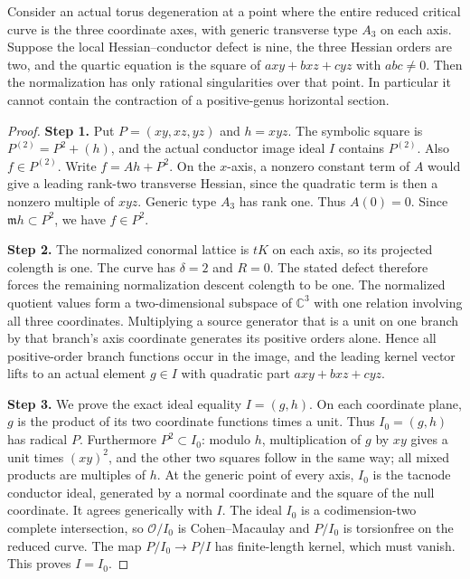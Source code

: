 \begin{proposition}[P4.47]
Consider an actual torus degeneration at a point where the
entire reduced critical curve is the three coordinate axes,
with generic transverse type $A_3$ on each axis. Suppose
the local Hessian--conductor defect is nine, the three
Hessian orders are two, and the quartic equation is the
square of $a xy+b xz+c yz$ with $abc\ne0$.
Then the normalization has only rational singularities
over that point. In particular it cannot contain the
contraction of a positive-genus horizontal section.
\end{proposition}
\begin{proof}
\noindent\textbf{Step 1.} Put $P=(xy,xz,yz)$ and $h=xyz$. The symbolic square is
$P^{(2)}=P^2+(h)$, and the actual conductor image ideal
$I$ contains $P^{(2)}$. Also $f\in P^{(2)}$.
Write $f=Ah+P^2$. On the $x$-axis, a nonzero constant
term of $A$ would give a leading rank-two transverse
Hessian, since the quadratic term is then a nonzero
multiple of $xyz$. Generic type $A_3$ has rank one.
Thus $A(0)=0$. Since $\mathfrak m h\subset P^2$,
we have $f\in P^2$.

\noindent\textbf{Step 2.} The normalized conormal lattice is $tK$ on each axis,
so its projected colength is one. The curve has
$\delta=2$ and $R=0$. The stated defect therefore
forces the remaining normalization descent colength
to be one. The normalized quotient values form a
two-dimensional subspace of $\mathbb C^3$ with one
relation involving all three coordinates. Multiplying
a source generator that is a unit on one branch by
that branch's axis coordinate generates its positive
orders alone. Hence all positive-order branch functions
occur in the image, and the leading kernel vector
lifts to an actual element $g\in I$ with quadratic
part $a xy+b xz+c yz$.

\noindent\textbf{Step 3.} We prove the exact ideal equality $I=(g,h)$.
On each coordinate plane, $g$ is the product of its
two coordinate functions times a unit. Thus
$I_0=(g,h)$ has radical $P$. Furthermore $P^2\subset I_0$:
modulo $h$, multiplication of $g$ by $xy$ gives a unit
times $(xy)^2$, and the other two squares follow in
the same way; all mixed products are multiples of $h$.
At the generic point of every axis, $I_0$ is the
tacnode conductor ideal, generated by a normal coordinate
and the square of the null coordinate. It agrees
generically with $I$. The ideal $I_0$ is a
codimension-two complete intersection, so
$\mathcal O/I_0$ is Cohen--Macaulay and $P/I_0$ is
torsionfree on the reduced curve. The map
$P/I_0\to P/I$ has finite-length kernel, which must
vanish. This proves $I=I_0$.


\end{proof}

